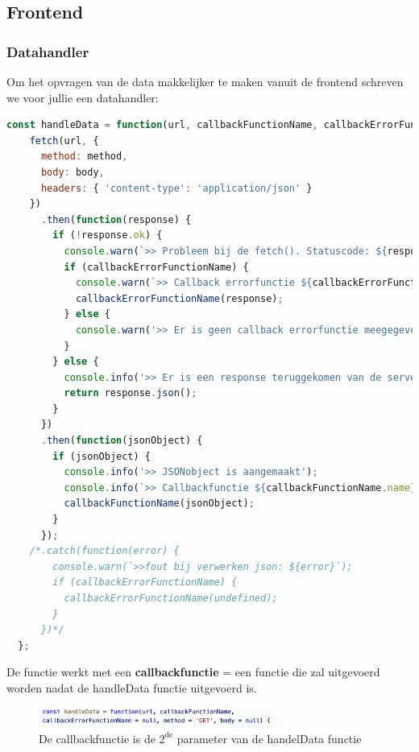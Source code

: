 \documentclass{article}
\newcommand{\bold}[1]{\textbf{#1}}
\begin{document}
\subsection{Frontend}
\subsubsection{Datahandler}
Om het opvragen van de data makkelijker te maken vanuit de frontend schreven we voor jullie een datahandler:


\begin{lstlisting}[language=JavaScript]
const handleData = function(url, callbackFunctionName, callbackErrorFunctionName = null, method = 'GET', body = null) {
    fetch(url, {
      method: method,
      body: body,
      headers: { 'content-type': 'application/json' }
    })
      .then(function(response) {
        if (!response.ok) {
          console.warn(`>> Probleem bij de fetch(). Statuscode: ${response.status}`);
          if (callbackErrorFunctionName) {
            console.warn(`>> Callback errorfunctie ${callbackErrorFunctionName.name}(response) wordt opgeroepen`);
            callbackErrorFunctionName(response); 
          } else {
            console.warn('>> Er is geen callback errorfunctie meegegeven als parameter');
          }
        } else {
          console.info('>> Er is een response teruggekomen van de server');
          return response.json();
        }
      })
      .then(function(jsonObject) {
        if (jsonObject) {
          console.info('>> JSONobject is aangemaakt');
          console.info(`>> Callbackfunctie ${callbackFunctionName.name}(response) wordt opgeroepen`);
          callbackFunctionName(jsonObject);
        }
      });
    /*.catch(function(error) {
        console.warn(`>>fout bij verwerken json: ${error}`);
        if (callbackErrorFunctionName) {
          callbackErrorFunctionName(undefined);
        }
      })*/
  };
\end{lstlisting}

De functie werkt met een \bold{callbackfunctie} = een functie die zal uitgevoerd worden nadat de handleData functie uitgevoerd is. 

\begin{figure}[H]
    \centering
    \includegraphics[width=0.7\textwidth]{img/Screenshot_20200302_111618.png}
    \caption{De callbackfunctie is de $2^{\text{de}}$ parameter van de handelData functie}
\end{figure}
\end{document}
